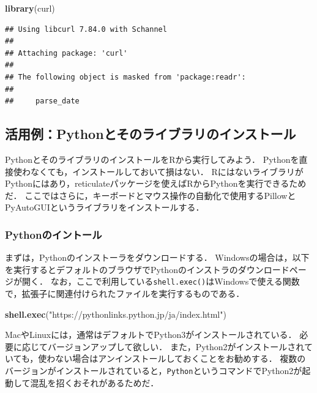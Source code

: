 \documentclass[
]{article}
\newenvironment{Shaded}{\begin{snugshade}}{\end{snugshade}}
\newcommand{\FunctionTok}[1]{\textcolor[rgb]{0.13,0.29,0.53}{\textbf{#1}}}
\newcommand{\NormalTok}[1]{#1}
\newcommand{\StringTok}[1]{\textcolor[rgb]{0.31,0.60,0.02}{#1}}
\begin{document}
\begin{Shaded}
\begin{Highlighting}[]
\FunctionTok{library}\NormalTok{(curl)}
\end{Highlighting}
\end{Shaded}

\begin{verbatim}
## Using libcurl 7.84.0 with Schannel
## 
## Attaching package: 'curl'
## 
## The following object is masked from 'package:readr':
## 
##     parse_date
\end{verbatim}

\hypertarget{install_python}{%
\subsection{活用例：Pythonとそのライブラリのインストール}\label{install_python}}

PythonとそのライブラリのインストールをRから実行してみよう．
Pythonを直接使わなくても，インストールしておいて損はない．
RにはないライブラリがPythonにはあり，reticulateパッケージを使えばRからPythonを実行できるためだ．
ここではさらに，キーボードとマウス操作の自動化で使用するPillowとPyAutoGUIというライブラリをインストールする．

\hypertarget{pythonux306eux30a4ux30f3ux30c8ux30fcux30eb}{%
\subsubsection{Pythonのイントール}\label{pythonux306eux30a4ux30f3ux30c8ux30fcux30eb}}

まずは，Pythonのインストーラをダウンロードする．
Windowsの場合は，以下を実行するとデフォルトのブラウザでPythonのインストラのダウンロードページが開く．
なお，ここで利用している\texttt{shell.exec()}はWindowsで使える関数で，拡張子に関連付けられたファイルを実行するものである．

\begin{Shaded}
\begin{Highlighting}[]
\FunctionTok{shell.exec}\NormalTok{(}\StringTok{"https://pythonlinks.python.jp/ja/index.html"}\NormalTok{)}
\end{Highlighting}
\end{Shaded}

MacやLinuxには，通常はデフォルトでPython3がインストールされている．
必要に応じてバージョンアップして欲しい．
また，Python2がインストールされていても，使わない場合はアンインストールしておくことをお勧めする．
複数のバージョンがインストールされていると，\texttt{Python}というコマンドでPython2が起動して混乱を招くおそれがあるためだ．
\end{document}
